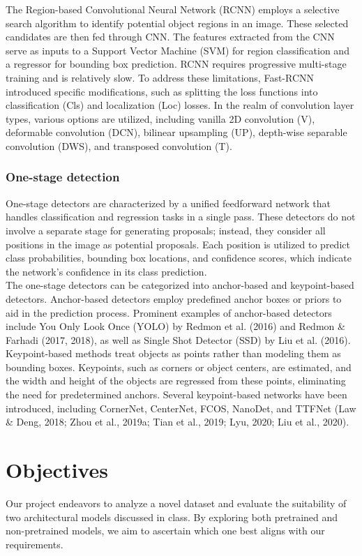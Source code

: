 The Region-based Convolutional Neural Network (RCNN) employs a selective search algorithm to identify potential object regions in an image. These selected candidates are then fed through CNN. The features extracted from the CNN serve as inputs to a Support Vector Machine (SVM) for region classification and a regressor for bounding box prediction. RCNN requires progressive multi-stage training and is relatively slow. To address these limitations, Fast-RCNN introduced specific modifications, such as splitting the loss functions into classification (Cls) and localization (Loc) losses.
In the realm of convolution layer types, various options are utilized, including vanilla 2D convolution (V), deformable convolution (DCN), bilinear upsampling (UP), depth-wise separable convolution (DWS), and transposed convolution (T). \cite{aranietal}

\subsubsection{One-stage detection}
One-stage detectors are characterized by a unified feedforward network that handles classification and regression tasks in a single pass. These detectors do not involve a separate stage for generating proposals; instead, they consider all positions in the image as potential proposals. Each position is utilized to predict class probabilities, bounding box locations, and confidence scores, which indicate the network's confidence in its class prediction.\cite{aranietal}\\
The one-stage detectors can be categorized into anchor-based and keypoint-based detectors. Anchor-based detectors employ predefined anchor boxes or priors to aid in the prediction process. Prominent examples of anchor-based detectors include You Only Look Once (YOLO) by Redmon et al. (2016) and Redmon \& Farhadi (2017, 2018), as well as Single Shot Detector (SSD) by Liu et al. (2016).\cite{aranietal}\\
Keypoint-based methods treat objects as points rather than modeling them as bounding boxes. Keypoints, such as corners or object centers, are estimated, and the width and height of the objects are regressed from these points, eliminating the need for predetermined anchors. Several keypoint-based networks have been introduced, including CornerNet, CenterNet, FCOS, NanoDet, and TTFNet (Law \& Deng, 2018; Zhou et al., 2019a; Tian et al., 2019; Lyu, 2020; Liu et al., 2020).\cite{aranietal}


\section{Objectives}
Our project endeavors to analyze a novel dataset and evaluate the suitability of two architectural models discussed in class. By exploring both pretrained and non-pretrained models, we aim to ascertain which one best aligns with our requirements.

